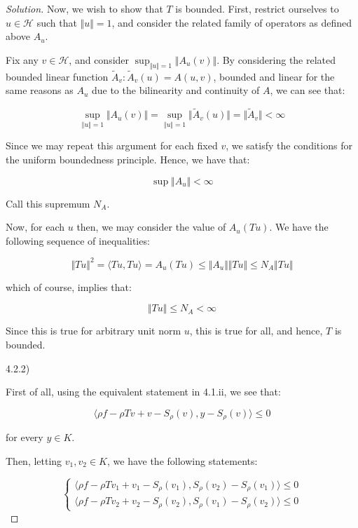 \documentclass[10pt]{article}
\begin{document}
\begin{proof}[Solution]



Now, we wish to show that $T$ is bounded. First, restrict ourselves to $u \in \mathcal{H}$ such that $\Vert u \Vert =1$, and consider the related family of operators as defined above $A_u$.

Fix any $v \in \mathcal{H}$, and consider $\sup_{\Vert u \Vert = 1} \Vert A_u(v) \Vert$. By considering the related bounded linear function $\tilde{A}_v: \tilde{A}_v(u) = A(u, v)$, bounded and linear for the same reasons as $A_u$ due to the bilinearity and continuity of $A$, we can see that:

$$\sup_{\Vert u \Vert = 1} \Vert A_u(v) \Vert = \sup_{\Vert u \Vert = 1} \Vert \tilde{A}_v(u) \Vert = \Vert \tilde{A}_v \Vert < \infty$$

Since we may repeat this argument for each fixed $v$, we satisfy the conditions for the uniform boundedness principle. Hence, we have that:

$$ \sup \Vert A_u \Vert < \infty $$

Call this supremum $N_A$.

Now, for each $u$ then, we may consider the value of $A_u(Tu)$. We have the following sequence of inequalities:

$$ \Vert Tu \Vert^2 = \langle Tu, Tu \rangle=A_u(Tu) \leq \Vert A_u \Vert \Vert Tu \Vert \leq N_A \Vert Tu \Vert$$

which of course, implies that:

$$ \Vert Tu \Vert \leq N_A < \infty$$

Since this is true for arbitrary unit norm $u$, this is true for all, and hence, $T$ is bounded.

4.2.2)

First of all, using the equivalent statement in 4.1.ii, we see that:

$$ \langle \rho f - \rho Tv + v - S_\rho(v), y - S_\rho(v) \rangle \leq 0$$

for every $y \in K$.

Then, letting $v_1, v_2 \in K$, we have the following statements:

$$ \begin{cases} \langle \rho f - \rho Tv_1 + v_1 - S_\rho(v_1), S_\rho(v_2) - S_\rho(v_1) \rangle \leq 0 \\ \langle \rho f - \rho Tv_2 + v_2 - S_\rho(v_2), S_\rho(v_1) - S_\rho(v_2) \rangle \leq 0 \end{cases}$$


\end{proof}
\end{document}
